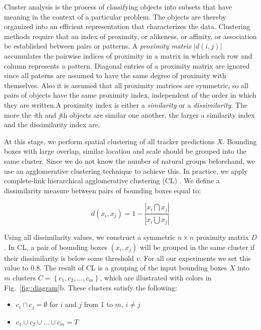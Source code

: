 Cluster analysis is the process of classifying objects into subsets that have
meaning in the context of a particular problem. The objects are thereby
organized into an efficient representation that characterizes the data.
Clustering methods require that an index of proximity, or alikeness, or
affinity, or association be established between pairs or patterns. A
\textit{proximity matrix} $|d(i, j)|$ accumulates the pairwise indices of
proximity in a matrix in which each row and column represents a pattern.
Diagonal entries of a proximity matrix are ignored since all paterns are
assumed to have the same degree of proximity with themselves. Also it is
assumed that all proximity matrices are symmetric, so all pairs of objects have
the same proximity index, independent of the order in which they are written.A
proximity index is either a \textit{similarity} or a \textit{dissimilarity}.
The more the \textit{i}th and \textit{j}th objects are similar one another, the
larger a similarity index and the dissimilarity index are.

At this stage, we perform spatial clustering of all tracker predictions $X$.
Bounding boxes with large overlap, similar location and scale should be grouped
into the same cluster.
Since we do not know the number of natural groups beforehand, we use
an agglomerative clustering technique to achieve this. In practice,
we apply complete-link hierarchical agglomerative clustering (CL)
\cite{Jain88}.
We define a dissimilarity measure between pairs of bounding boxes equal to:

\begin{equation}
d(x_i,x_j) = 1 - \frac{|x_i \bigcap x_j|}{|x_i \bigcup  x_j|}
\label{eq::overlap}
\end{equation}

Using all dissimilarity values, we construct a symmetric $n \times n$ proximity
matrix $D$. In CL, a pair of bounding boxes $(x_i, x_j)$ will be grouped in
the same cluster if their dissimilarity is below some threshold $v$.
For all our experiments we set this value to $0.8$.
The result of CL is a grouping of the input bounding boxes $X$ into 
$m$ clusters $C = \left \{ c_1, c_2, ..., c_m \right \}$,
which are illustrated with colors in Fig.~\ref{fig::diagram}b. These clusters
satisfy the following:
\begin{itemize}
\item $c_i \cap c_j = \emptyset$ for $i$ and $j$ from 1 to $m$, $i \neq j$
\item $c_1 \cup c_2 \cup ... \cup c_m = T$
\end{itemize}

